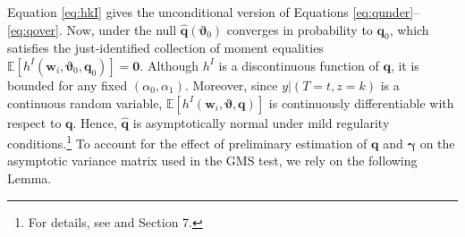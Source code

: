 Equation \ref{eq:hkI} gives the unconditional version of Equations \ref{eq:qunder}--\ref{eq:qover}.
Now, under the null $\widehat{\mathbf{q}}(\boldsymbol{\vartheta}_0)$ converges in probability to $\mathbf{q}_0$, which satisfies the just-identified collection of moment equalities $\mathbb{E}[h^I(\mathbf{w}_i, \boldsymbol{\vartheta}_0,\mathbf{q}_0)] = \mathbf{0}$.
Although $h^I$ is a discontinuous function of $\mathbf{q}$, it is bounded for any fixed $(\alpha_0, \alpha_1)$.
Moreover, since $y|(T=t,z=k)$ is a continuous random variable, $\mathbb{E}[h^I(\mathbf{w}_i,\boldsymbol{\vartheta}, \mathbf{q})]$ is continuously differentiable with respect to $\mathbf{q}$.
Hence, $\widehat{\mathbf{q}}$ is asymptotically normal under mild regularity conditions.\footnote{For details, see \cite{andrews1994empirical} and \cite{newey1994large} Section 7.}
To account for the effect of preliminary estimation of $\mathbf{q}$ and $\boldsymbol{\gamma}$ on the asymptotic variance matrix used in the GMS test, we rely on the following Lemma.

